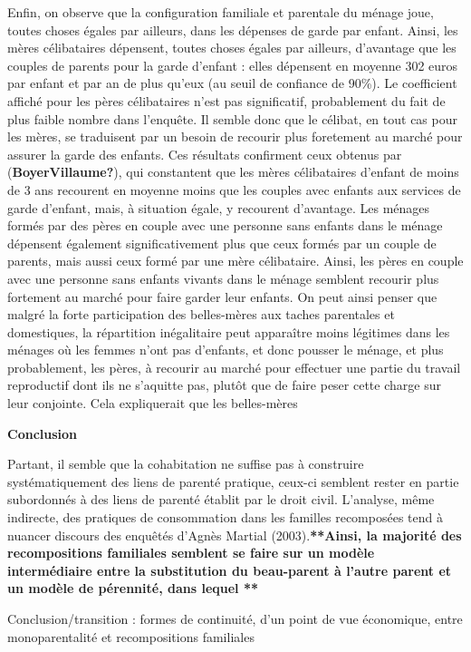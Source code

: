 \documentclass[
  12pt,
]{book}
\begin{document}
Enfin, on observe que la configuration familiale et parentale du ménage
joue, toutes choses égales par ailleurs, dans les dépenses de garde par
enfant. Ainsi, les mères célibataires dépensent, toutes choses égales
par ailleurs, d'avantage que les couples de parents pour la garde
d'enfant : elles dépensent en moyenne 302 euros par enfant et par an de
plus qu'eux (au seuil de confiance de 90\%). Le coefficient affiché pour
les pères célibataires n'est pas significatif, probablement du fait de
plus faible nombre dans l'enquête. Il semble donc que le célibat, en
tout cas pour les mères, se traduisent par un besoin de recourir plus
foretement au marché pour assurer la garde des enfants. Ces résultats
confirment ceux obtenus par (\textbf{BoyerVillaume?}), qui constantent
que les mères célibataires d'enfant de moins de 3 ans recourent en
moyenne moins que les couples avec enfants aux services de garde
d'enfant, mais, à situation égale, y recourent d'avantage. Les ménages
formés par des pères en couple avec une personne sans enfants dans le
ménage dépensent également significativement plus que ceux formés par un
couple de parents, mais aussi ceux formé par une mère célibataire.
Ainsi, les pères en couple avec une personne sans enfants vivants dans
le ménage semblent recourir plus fortement au marché pour faire garder
leur enfants. On peut ainsi penser que malgré la forte participation des
belles-mères aux taches parentales et domestiques, la répartition
inégalitaire peut apparaître moins légitimes dans les ménages où les
femmes n'ont pas d'enfants, et donc pousser le ménage, et plus
probablement, les pères, à recourir au marché pour effectuer une partie
du travail reproductif dont ils ne s'aquitte pas, plutôt que de faire
peser cette charge sur leur conjointe. Cela expliquerait que les
belles-mères

\textbf{Conclusion}

Partant, il semble que la cohabitation ne suffise pas à construire
systématiquement des liens de parenté pratique, ceux-ci semblent rester
en partie subordonnés à des liens de parenté établit par le droit civil.
L'analyse, même indirecte, des pratiques de consommation dans les
familles recomposées tend à nuancer discours des enquêtés d'Agnès
Martial (2003).\textbf{**Ainsi, la majorité des recompositions
familiales semblent se faire sur un modèle intermédiaire entre la
substitution du beau-parent à l'autre parent et un modèle de pérennité,
dans lequel **}

Conclusion/transition : formes de continuité, d'un point de vue
économique, entre monoparentalité et recompositions familiales
\end{document}
